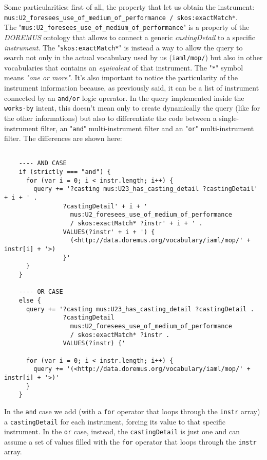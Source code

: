 	Some particularities: first of all, the property that let us obtain the instrument:\\ \texttt{mus:U2\_foresees\_use\_of\_medium\_of\_performance
		/ skos:exactMatch*}.\\
	The "\texttt{mus:U2\_foresees\_use\_of\_medium\_of\_performance}" is a property of the \textit{DOREMUS} ontology that allows to connect a generic \textit{castingDetail} to a specific \textit{instrument}. The "\texttt{skos:exactMatch*}" is instead a way to allow the query to search not only in the actual vocabulary used by us (\texttt{iaml/mop/}) but also in other vocabularies that contains an \textit{equivalent} of that instrument. The "\texttt{*}" symbol means \textit{"one or more"}.
	It's also important to notice the particularity of the instrument information because, as previously said, it can be a list of instrument connected by an \texttt{and/or} logic operator. In the query implemented inside the \texttt{works-by} intent, this doesn't mean only to create dynamically the query (like for the other informations) but also to differentiate the code between a single-instrument filter, an "\texttt{and}" multi-instrument filter and an "\texttt{or}" multi-instrument filter. The differences are shown here:
	\begin{lstlisting}
	
	---- AND CASE
	if (strictly === "and") {
	  for (var i = 0; i < instr.length; i++) {
	    query += '?casting mus:U23_has_casting_detail ?castingDetail' + i + ' .
	            ?castingDetail' + i + '
	              mus:U2_foresees_use_of_medium_of_performance
	              / skos:exactMatch* ?instr' + i + ' .
	            VALUES(?instr' + i + ') {
	              (<http://data.doremus.org/vocabulary/iaml/mop/' + instr[i] + '>)
	            }'
	  }
	}
	
	---- OR CASE
	else {
	  query += '?casting mus:U23_has_casting_detail ?castingDetail .
	            ?castingDetail
	              mus:U2_foresees_use_of_medium_of_performance
	              / skos:exactMatch* ?instr .
	            VALUES(?instr) {'
	
	  for (var i = 0; i < instr.length; i++) {
	    query += '(<http://data.doremus.org/vocabulary/iaml/mop/' + instr[i] + '>)'
	  }
	}
	\end{lstlisting}
	In the \texttt{and} case we add (with a \texttt{for} operator that loops through the \texttt{instr} array) a \texttt{castingDetail} for each instrument, forcing its value to that specific instrument. In the \texttt{or} case, instead, the \texttt{castingDetail} is just one and can assume a set of values filled with the \texttt{for} operator that loops through the \texttt{instr} array. 

